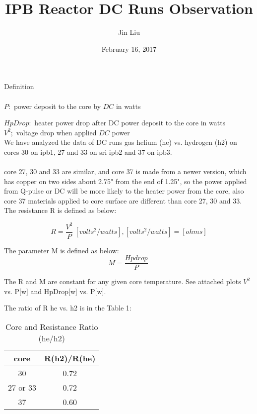\documentclass{article}
\title{IPB Reactor DC Runs Observation}
\author{Jin Liu}
\date{February 16, 2017}
\begin{document}
\maketitle

Definition\\
\\
$P:$ power deposit to the core by $DC$ in watts

$HpDrop:$ heater power drop after DC power deposit to the core in watts\\

$V^{2};$ voltage drop when applied $DC$ power\\

We have analyzed the data of DC runs gas helium (he) vs. hydrogen (h2) on cores 30 on ipb1, 27 and 33 on sri-ipb2 and 37 on ipb3. \\
\\
core 27, 30 and 33 are similar, and core 37 is made from a newer version, which has copper on two sides about 2.75" from the end of 1.25", so the power applied from Q-pulse or DC will be more likely to the heater power from the core, also core 37 materials applied to core surface are different than core 27, 30 and 33. \\

The resistance R is defined as below:

\begin{equation}
R=\frac{V^{2}}{P}\ [volts^{2}/watts], [volts^{2}/watts]=[ohms]\label{1}%
\end{equation}

The parameter M is defined as below:
\begin{equation}
M=\frac{Hpdrop}{P}\ \label{4}%
\end{equation}

The R and M are constant for any given core temperature. See attached plots $V^2$ vs. P[w] and HpDrop[w] vs. P[w].

The ratio of R he vs. h2 is in the Table 1:
\begin{table}
[h]
\centering
\caption{Core and Resistance Ratio (he/h2)}
\begin{tabular}{|c|c|}
\hline
core & R(h2)/R(he)\\ \hline
30 & 0.72\\  \hline
27 or 33 & 0.72\\  \hline
37 & 0.60\\  \hline
\end{tabular}
\end{table}
\end{document}
